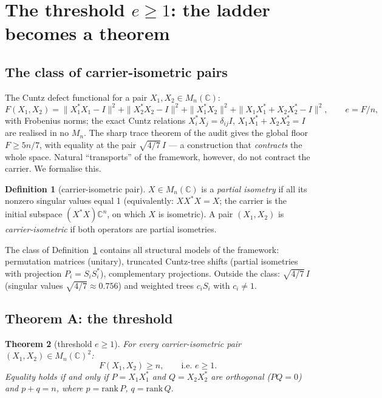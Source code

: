 \documentclass[11pt,a4paper]{article}
\newtheorem{theorem}{Theorem}[section]
\theoremstyle{definition}
\newtheorem{definition}[theorem]{Definition}
\theoremstyle{remark}
\begin{document}
\section{The threshold $e \ge 1$: the ladder becomes a theorem}\label{sec:threshold}

\subsection{The class of carrier-isometric pairs}

The Cuntz defect functional for a pair $X_1, X_2 \in M_n(\mathbb{C})$:
\begin{equation}\label{eq:F}
F(X_1, X_2) = \|X_1^*X_1 - I\|^2 + \|X_2^*X_2 - I\|^2
+ \|X_1^*X_2\|^2 + \|X_1X_1^* + X_2X_2^* - I\|^2,
\qquad e = F/n,
\end{equation}
with Frobenius norms; the exact Cuntz relations $X_i^*X_j = \delta_{ij}I$,
$X_1X_1^* + X_2X_2^* = I$ are realised in no $M_n$. The sharp trace theorem
of the audit gives the global floor $F \ge 5n/7$, with equality at the pair
$\sqrt{4/7}\,I$ --- a construction that \emph{contracts} the whole space.
Natural ``transports'' of the framework, however, do not contract the
carrier. We formalise this.

\begin{definition}[carrier-isometric pair]\label{def:carrier}
$X \in M_n(\mathbb{C})$ is a \emph{partial isometry} if all its nonzero
singular values equal 1 (equivalently: $XX^*X = X$; the carrier is the
initial subspace $(X^*X)\mathbb{C}^n$, on which $X$ is isometric). A pair
$(X_1, X_2)$ is \emph{carrier-isometric} if both operators are partial
isometries.
\end{definition}

The class of Definition~\ref{def:carrier} contains all structural models of
the framework: permutation matrices (unitary), truncated Cuntz-tree shifts
(partial isometries with projection $P_i = S_iS_i^*$), complementary
projections. Outside the class: $\sqrt{4/7}\,I$ (singular values
$\sqrt{4/7} \approx 0.756$) and weighted trees $c_iS_i$ with $c_i \ne 1$.

\subsection{Theorem A: the threshold}

\begin{theorem}[threshold $e \ge 1$]\label{thm:A}
For every carrier-isometric pair $(X_1, X_2) \in M_n(\mathbb{C})^2$:
\begin{equation}\label{eq:thmA}
F(X_1, X_2) \ge n, \qquad \text{i.e. } e \ge 1.
\end{equation}
Equality holds if and only if $P = X_1X_1^*$ and $Q = X_2X_2^*$ are
orthogonal ($PQ = 0$) and $p + q = n$, where $p = \mathrm{rank}\,P$,
$q = \mathrm{rank}\,Q$.
\end{theorem}
\end{document}
